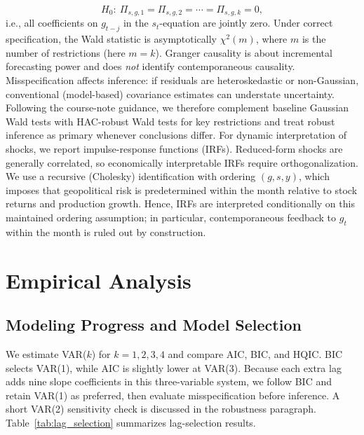 \documentclass[12pt]{article}
\begin{document}
\begin{equation}
H_0:\ \Pi_{s,g,1}=\Pi_{s,g,2}=\cdots=\Pi_{s,g,k}=0,
\end{equation}
i.e., all coefficients on \(g_{t-j}\) in the \(s_t\)-equation are jointly zero. Under correct specification, the Wald statistic is asymptotically \(\chi^2(m)\), where \(m\) is the number of restrictions (here \(m=k\)). Granger causality is about incremental forecasting power and does \emph{not} identify contemporaneous causality.
\newline
\newline
Misspecification affects inference: if residuals are heteroskedastic or non-Gaussian, conventional (model-based) covariance estimates can understate uncertainty. Following the course-note guidance, we therefore complement baseline Gaussian Wald tests with HAC-robust Wald tests for key restrictions and treat robust inference as primary whenever conclusions differ.
\newline
\newline
For dynamic interpretation of shocks, we report impulse-response functions (IRFs). Reduced-form shocks are generally correlated, so economically interpretable IRFs require orthogonalization. We use a recursive (Cholesky) identification with ordering \((g,s,y)\), which imposes that geopolitical risk is predetermined within the month relative to stock returns and production growth. Hence, IRFs are interpreted conditionally on this maintained ordering assumption; in particular, contemporaneous feedback to \(g_t\) within the month is ruled out by construction.



\section{Empirical Analysis}

\subsection{Modeling Progress and Model Selection}

We estimate VAR($k$) for $k=1,2,3,4$ and compare AIC, BIC, and HQIC. BIC selects VAR(1), while AIC is slightly lower at VAR(3). Because each extra lag adds nine slope coefficients in this three-variable system, we follow BIC and retain VAR(1) as preferred, then evaluate misspecification before inference. A short VAR(2) sensitivity check is discussed in the robustness paragraph.
Table~\ref{tab:lag_selection} summarizes lag-selection results.
\end{document}
